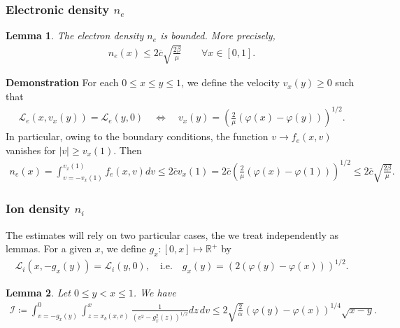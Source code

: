 \documentclass{article}
\newtheorem{lem}{Lemma}[section]
\numberwithin{equation}{section}
\newcommand{\myproof}[1]{
	\noindent \textbf{Demonstration}
	{\small	#1 \hfill \qedsymbol}
}
\newcommand{\maxfe}{{\overline{c}}} %
\begin{document}
\subsubsection{Electronic density $n_e$}

\begin{lem}\label{lem:ne_continuous_space}
	The electron density $n_e$ is bounded. More precisely, 
	\begin{align*}
		n_e(x) \leqslant 2 \maxfe \sqrt{\frac{2\beta}{\mu}} \quad\quad\forall x \in[0,1].
	\end{align*}
\end{lem}

\myproof{
	For each $0\leqslant x \leqslant y \leqslant 1$, we define the velocity $v_x(y) \geqslant 0$ such that 
	\begin{align*}
		\mathcal{L}_e(x,v_x(y)) = \mathcal{L}_e(y,0) \quad \iff \quad v_x(y) = \left(\frac{2}{\mu}\left(\varphi(x) - \varphi(y)\right)\right)^{1/2}.
	\end{align*} 
	In particular, owing to the boundary conditions, the function $v \to f_e(x,v)$ vanishes for $|v| \geqslant v_x(1)$. Then
	\begin{align*}
		n_e(x) = \int_{v=-v_x(1)}^{v_x(1)} f_e(x,v) dv \leqslant 2 \maxfe v_x(1) = 2 \maxfe \left(\frac{2}{\mu} (\varphi(x) - \varphi(1))\right)^{1/2} \leqslant 2 \maxfe \sqrt{\frac{2\beta}{\mu}}.
	\end{align*}
}

\subsubsection{Ion density $n_i$}

The estimates will rely on two particular cases, the we treat independently as lemmas. For a given $x$, we define $g_x : [0,x] \mapsto \mathbb{R}^{+}$ by
\begin{align*}
	\mathcal{L}_i(x,-g_x(y)) = \mathcal{L}_i(y,0), \quad \text{i.e.} \quad g_x(y) = \left(2\left(\varphi(y) - \varphi(x)\right)\right)^{1/2}.
\end{align*}

\begin{lem}\label{lem:upperbound_ni_endchar}
	Let $0\leqslant y < x \leqslant 1$. We have
	\begin{align*}
		\mathcal{I} \coloneqq \int_{v=-g_x(y)}^{0} \int_{z = x_b(x,v)}^{x} \frac{1}{\left(v^2-g_x^2(z)\right)^{1/2}} dz\,dv \leqslant 2 \sqrt{\frac{2}{\alpha}}\left(\varphi(y) - \varphi(x)\right)^{1/4} \sqrt{x-y}. 
	\end{align*}
\end{lem}
\end{document}
